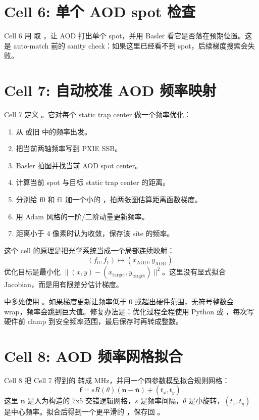 \documentclass[11pt,oneside,openany]{book}
\begin{document}
\section{Cell 6: 单个 AOD spot 检查}
Cell 6 用  取 ，让 AOD 打出单个 spot，并用 Basler 看它是否落在预期位置。这是 auto-match 前的 sanity check：如果这里已经看不到 spot，后续梯度搜索会失败。

\section{Cell 7: 自动校准 AOD 频率映射}
Cell 7 定义 。它对每个 static trap center 做一个频率优化：
\begin{enumerate}
  \item 从  或旧  中的频率出发。
  \item 把当前两轴频率写到 PXIE SSB。
  \item Basler 拍图并找当前 AOD spot center。
  \item 计算当前 spot 与目标 static trap center 的距离。
  \item 分别给 f0 和 f1 加一个小的 ，拍两张图估算距离函数梯度。
  \item 用 Adam 风格的一阶/二阶动量更新频率。
  \item 距离小于 4 像素时认为收敛，保存该 site 的频率。
\end{enumerate}

这个 cell 的原理是把光学系统当成一个局部连续映射：
\[
  (f_0, f_1) \mapsto (x_\mathrm{AOD}, y_\mathrm{AOD}).
\]
优化目标是最小化 \(\|(x,y)-(x_\mathrm{target},y_\mathrm{target})\|^2\)。这里没有显式拟合 Jacobian，而是用有限差分估计梯度。

\begin{notebox}[潜在风险]
 中多处使用 。如果梯度更新让频率低于 0 或超出硬件范围，无符号整数会 wrap，频率会跳到巨大值。修复办法是：优化过程全程使用 Python  或 ，每次写硬件前 clamp 到安全频率范围，最后保存时再转成整数。
\end{notebox}

\section{Cell 8: AOD 频率网格拟合}
Cell 8 把 Cell 7 得到的  转成 MHz，并用一个四参数模型拟合规则网格：
\[
  \mathbf f = s R(\theta)(\mathbf n-\bar{\mathbf n}) + (t_x,t_y).
\]
这里 \(\mathbf n\) 是人为构造的 7x5 交错逻辑网格，\(s\) 是频率间隔，\(\theta\) 是小旋转，\((t_x,t_y)\) 是中心频率。拟合后得到一个更平滑的 ，保存回 。
\end{document}
